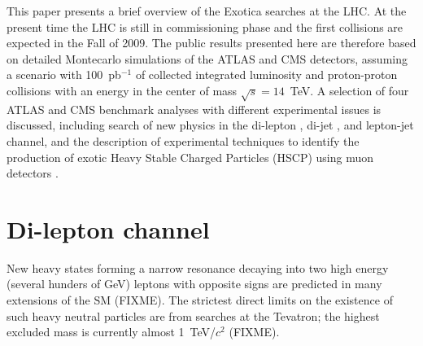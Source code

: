 \documentclass{cimento}
\begin{document}
This paper presents a brief overview of the Exotica searches at the LHC. 
At the present time the LHC is still in commissioning phase 
and the first collisions are expected in the Fall of 2009.
The public results presented here are therefore based on detailed 
Montecarlo simulations of the ATLAS and CMS detectors, 
assuming a scenario with 100~pb$^{-1}$ of collected integrated luminosity 
and proton-proton collisions with an energy in the center 
of mass $\sqrt{s} = 14$~TeV. 
A selection of four ATLAS and CMS benchmark analyses with different 
experimental issues is discussed, including 
search of new physics in the di-lepton
, di-jet
, and lepton-jet
channel, 
and the description of experimental techniques to identify the production of 
exotic Heavy Stable Charged Particles (HSCP) 
using muon detectors
.


\section{Di-lepton channel} \label{dilepton}

New heavy states forming a narrow resonance decaying 
into two high energy (several hunders of GeV) 
leptons with opposite signs are predicted in  
many extensions of the SM (FIXME).
The strictest direct limits on the existence of such 
heavy neutral particles are from searches 
at the Tevatron; the highest excluded mass is currently almost 1~TeV/$c^2$ (FIXME).
\end{document}
